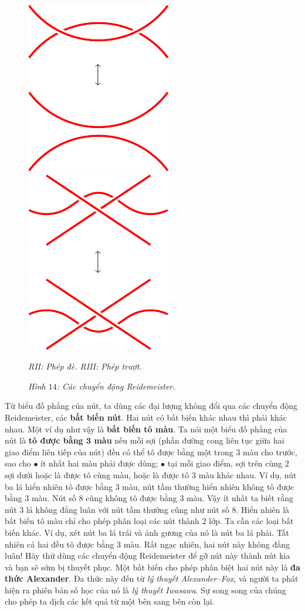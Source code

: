 \begin{multicols}{2}
\begin{figure}[H]
		\includegraphics[width= 0.35\linewidth]{R2.pdf}\quad
		\includegraphics[width= 0.35\linewidth]{R3.pdf}
		\caption{\small\textit{\color{duongvaotoanhoc}RII: Phép đè.\hspace*{30pt} RIII: Phép trượt.}}
		\caption{\small\textit{\color{duongvaotoanhoc}Hình $14$: Các chuyển động Reidemeister.}}
		\vspace*{-10pt}
	\end{figure}
	Từ biểu đồ phẳng của nút, ta dùng các đại lượng không đổi qua các chuyển động Reidemeister, các {\bf\color{duongvaotoanhoc} bất biến nút}. Hai nút có bất biến khác nhau thì phải khác nhau. Một ví dụ như vậy là {\bf\color{duongvaotoanhoc} bất biến tô màu}. Ta nói một biểu đồ phẳng của nút là {\bf\color{duongvaotoanhoc} tô được bằng $\pmb{3}$ màu} nếu mỗi sợi (phần đường cong liên tục giữa hai giao điểm liên tiếp của nút) đều có thể tô được bằng một trong $3$ màu cho trước, sao cho
	\vskip 0.1cm
	$\bullet$ ít nhất hai màu phải được dùng;
	\vskip 0.1cm
	$\bullet$ tại mỗi giao điểm, sợi trên cùng $2$ sợi dưới hoặc là được tô cùng màu, hoặc là được tô $3$ màu khác nhau.
	\vskip 0.1cm
	Ví dụ, nút ba lá hiển nhiên tô được bằng $3$ màu, nút tầm thường hiển nhiên không tô được bằng $3$ màu. Nút số $8$ cũng không tô được bằng $3$ màu. Vậy ít nhất ta biết rằng nút $3$ lá không đẳng luân với nút tầm thường cũng như nút số $8$.
	\vskip 0.1cm
	Hiển nhiên là bất biến tô màu chỉ cho phép phân loại các nút thành $2$ lớp. Ta cần các loại bất biến khác. Ví dụ, xét nút ba lá trái và ảnh gương của nó là nút ba lá phải. Tất nhiên cả hai đều tô được bằng $3$ màu. Rất ngạc nhiên, hai nút này không đẳng luân! Hãy thử dùng các chuyển động Reidemeister để gỡ nút này thành nút kia và bạn sẽ sớm bị thuyết phục. Một bất biến cho phép phân biệt hai nút này là {\bf\color{duongvaotoanhoc} đa thức Alexander}. Đa thức này đến từ {\it lý thuyết Alexander--Fox}, và người ta phát hiện ra phiên bản số học của nó là {\it lý thuyết Iwasawa}. Sự song song của chúng cho phép ta dịch các kết quả từ một bên sang bên còn lại.

\end{multicols}
